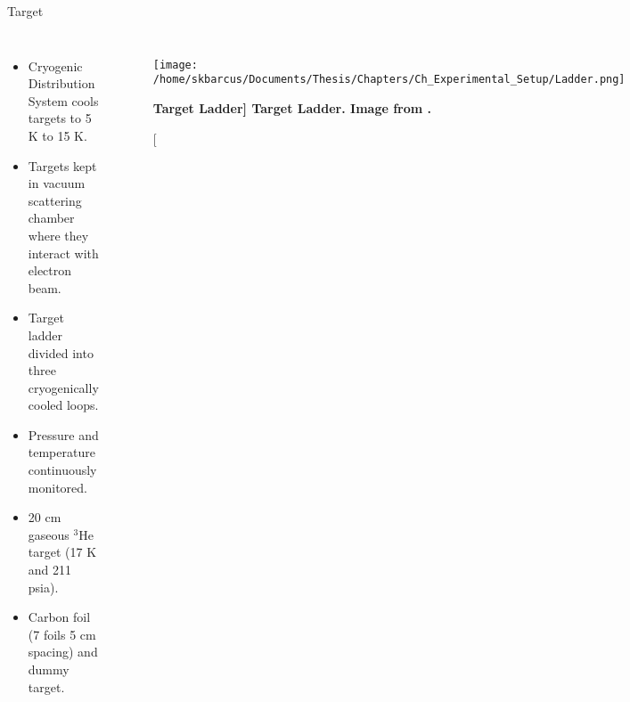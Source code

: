 \documentclass[10pt]{beamer}
\begin{document}
\begin{frame}[fragile]{Target}

	\begin{columns}[T,onlytextwidth]  
	\begin{itemize}
		\item \alert{C}ryogenic \alert{D}istribution \alert{S}ystem cools targets to 5 K to 15 K.
		\item Targets kept in \alert{vacuum scattering chamber} where they interact with electron beam.
		\pause
		\item \alert{Target ladder} divided into three cryogenically cooled loops. 
		\item Pressure and temperature continuously monitored.
		\item \alert{20 cm gaseous $^3$He target} (17 K and 211 psia).
		\item Carbon foil (7 foils 5 cm spacing) and dummy target. 
	\end{itemize}

	\begin{figure}[!ht]
	\begin{center}
	\texttt{[image: /home/skbarcus/Documents/Thesis/Chapters/Ch\_Experimental\_Setup/Ladder.png]}
	\end{center}
	\caption[\bf{Target Ladder}]{
	{\bf{Target Ladder.}} Image from \cite{Thesis:Ye}.}
	\label{fig:halla_top}
	\end{figure}
	
	\end{columns}
	
\end{frame}
\end{document}

